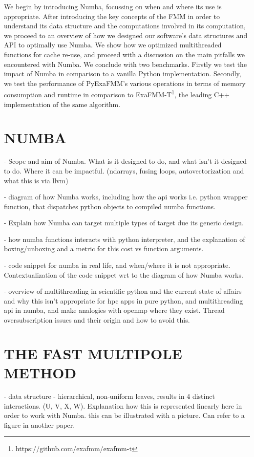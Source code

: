 \documentclass{IEEEcsmag}
\begin{document}
We begin by introducing Numba, focussing on when and where its use is appropriate. After introducing the key concepts of the FMM in order to understand its data structure and the computations involved in its computation, we proceed to an overview of how we designed our software's data structures and API to optimally use Numba. We show how we optimized multithreaded functions for cache re-use, and proceed with a discussion on the main pitfalls we encountered with Numba. We conclude with two benchmarks. Firstly we test the impact of Numba in comparison to a vanilla Python implementation. Secondly, we test the performance of PyExaFMM's various operations in terms of memory consumption and runtime in comparison to ExaFMM-T\footnote{https://github.com/exafmm/exafmm-t}, the leading C++ implementation of the same algorithm.

\section{NUMBA}

- Scope and aim of Numba. What is it designed to do, and what isn't it designed to do. Where it can be impactful. (ndarrays, fusing loops, autovectorization and what this is via llvm)

- diagram of how Numba works, including how the api works i.e. python wrapper function, that dispatches python objects to compiled numba functions. 

- Explain how Numba can target multiple types of target due its generic design.

- how numba functions interacts with python interpreter, and the explanation of boxing/unboxing and a metric for this cost vs function arguments.

- code snippet for numba in real life, and when/where it is not appropriate. Contextualization of the code snippet wrt to the diagram of how Numba works.

- overview of multithreading in scientific python and the current state of affairs and why this isn't appropriate for hpc apps in pure python, and multithreading api in numba, and make analogies with openmp where they exist. Thread oversubscription issues and their origin and how to avoid this.

\section{THE FAST MULTIPOLE METHOD}

- data structure - hierarchical, non-uniform leaves, results in 4 distinct interactions. (U, V, X, W). Explanation how this is represented linearly here in order to work with Numba.
	this can be illustrated with a picture. Can refer to a figure in another paper.
\end{document}
